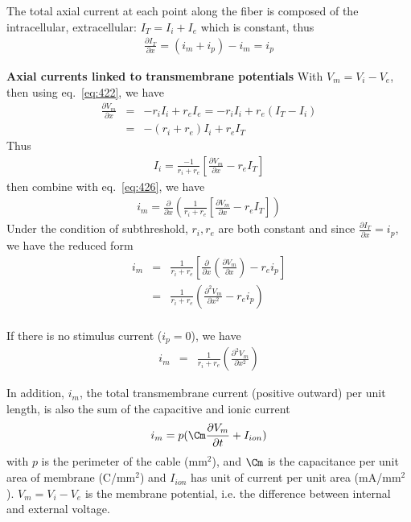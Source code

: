 The total axial current at each point along the fiber is composed of
the intracellular, extracellular: $I_T = I_i + I_e$ which is constant,
thus
\begin{eqnarray}
  \label{eq:498}
  \frac{\partial I_T}{\partial x} = (i_m+i_p)-i_m = i_p
\end{eqnarray}

{\bf Axial currents linked to transmembrane potentials}
With $V_m=V_i-V_e$, then using eq.~\eqref{eq:422}, we have
\begin{eqnarray}
  \label{eq:499}
  \frac{\partial V_m}{\partial x} &=& - r_iI_i + r_eI_e = -r_iI_i +
  r_e(I_T-I_i) \\
 &=&  -(r_i+r_e)I_i + r_eI_T
\end{eqnarray}
Thus
\begin{eqnarray}
  \label{eq:500}
  I_i = \frac{-1}{r_i+r_e}\left[\frac{\partial V_m}{\partial x} - r_eI_T\right]
\end{eqnarray}
then combine with eq.~\eqref{eq:426}, we have
\begin{eqnarray}
  \label{eq:501}
  i_m  = \frac{\partial}{\partial x}\left(\frac{1}{r_i+r_e}\left[\frac{\partial V_m}{\partial x} - r_eI_T\right]\right)
\end{eqnarray}
Under the condition of subthreshold, $r_i, r_e$ are both constant and
since $\frac{\partial I_T}{\partial x} = i_p$, we have the reduced form
\begin{eqnarray}
  \label{eq:429}
   i_m  &=& \frac{1}{r_i+r_e} \left[\frac{\partial}{\partial
     x}\left(\frac{\partial V_m}{\partial x}\right)
   - r_ei_p \right]\\ 
   &=&  \frac{1}{r_i+r_e} \left(\frac{\partial^2 V_m}{\partial x^2}
   - r_ei_p \right)\\ 
\end{eqnarray}

\textbullet If there is no stimulus current ($i_p=0$), we have
\begin{eqnarray}
  \label{eq:502}
    i_m  &=&  \frac{1}{r_i+r_e} \left(\frac{\partial^2 V_m}{\partial x^2}
    \right)
\end{eqnarray}


In addition, $i_m$, the total transmembrane current (positive outward)
per unit length, is also the sum of the capacitive and ionic current
\begin{eqnarray}
  \label{eq:425}
  i_m = p(\Cm\frac{\partial V_m}{\partial t} + I_{ion})
\end{eqnarray}
with $p$ is the perimeter of the cable (mm$^2$), and $\Cm$ is the
capacitance per unit area of membrane (C/mm$^2$) and $I_{ion}$ has
unit of current per unit area (mA/mm$^2$). $V_m=V_i-V_e$ is the
membrane potential, i.e. the difference between internal and external
voltage.

